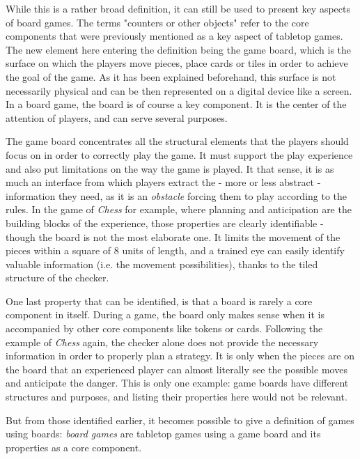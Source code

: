 While this is a rather broad definition, it can still be used to present key aspects of board games. The terms "counters or other objects" refer to the core components that were previously mentioned as a key aspect of tabletop games. The new element here entering the definition being the game board, which is the surface on which the players move pieces, place cards or tiles in order to achieve the goal of the game. As it has been explained beforehand, this surface is not necessarily physical and can be then represented on a digital device like a screen. In a board game, the board is of course a key component. It is the center of the attention of players, and can serve several purposes.

The game board concentrates all the structural elements that the players should focus on in order to correctly play the game. It must support the play experience and also put limitations on the way the game is played. It that sense, it is as much an interface from which players extract the - more or less abstract - information they need, as it is an \textit{obstacle} forcing them to play according to the rules. 
In the game of \textit{Chess} for example, where planning and anticipation are the building blocks of the experience, those properties are clearly identifiable - though the board is not the most elaborate one. It limits the movement of the pieces within a square of 8 units of length, and a trained eye can easily identify valuable information (i.e. the movement possibilities), thanks to the tiled structure of the checker. 

One last property that can be identified, is that a board is rarely a core component in itself. During a game, the board only makes sense when it is accompanied by other core components like tokens or cards. Following the example of \textit{Chess} again, the checker alone does not provide the necessary information in order to properly plan a strategy. It is only when the pieces are on the board that an experienced player can almost literally see the possible moves and anticipate the danger. 
This is only one example: game boards have different structures and purposes, and listing their properties here would not be relevant. 

But from those identified earlier, it becomes possible to give a definition of games using boards: \textit{board games} are tabletop games using a game board and its properties as a core component.

